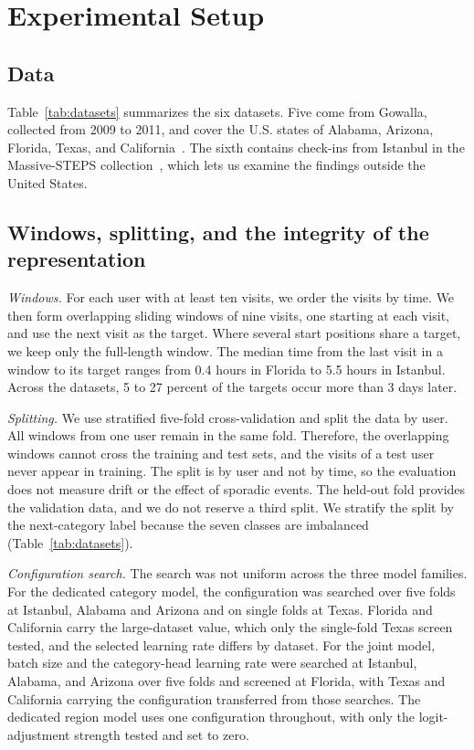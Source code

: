 \section{Experimental Setup}
\label{sec:setup}

\subsection{Data}
\label{sec:setup-data}
Table~\ref{tab:datasets} summarizes the six datasets. Five come from Gowalla, collected from 2009 to 2011, and cover the U.S. states of Alabama, Arizona, Florida, Texas, and California~\cite{cho2011gowalla}. The sixth contains check-ins from Istanbul in the Massive-STEPS collection~\cite{wongso2025massivesteps}, which lets us examine the findings outside the United States.


\subsection{Windows, splitting, and the integrity of the representation}
\label{sec:setup-windows}
\emph{Windows.} For each user with at least ten visits, we order the visits by time. We then form overlapping sliding windows of nine visits, one starting at each visit, and use the next visit as the target. Where several start positions share a target, we keep only the full-length window. The median time from the last visit in a window to its target ranges from 0.4 hours in Florida to 5.5 hours in Istanbul. Across the datasets, 5 to 27 percent of the targets occur more than 3 days later.

\emph{Splitting.} We use stratified five-fold cross-validation and split the data by user. All windows from one user remain in the same fold. Therefore, the overlapping windows cannot cross the training and test sets, and the visits of a test user never appear in training. The split is by user and not by time, so the evaluation does not measure drift or the effect of sporadic events. The held-out fold provides the validation data, and we do not reserve a third split. We stratify the split by the next-category label because the seven classes are imbalanced (Table~\ref{tab:datasets}).

\emph{Configuration search.} The search was not uniform across the three model families.
For the dedicated category model, the configuration was searched over five folds at Istanbul, Alabama and Arizona and on single folds at Texas. Florida and California carry the large-dataset value, which only the single-fold Texas screen tested, and the selected learning rate differs by dataset. For the joint model, batch size and the category-head learning rate were searched at Istanbul, Alabama, and Arizona over five folds and screened at Florida, with Texas and California carrying the configuration transferred from those searches. The dedicated region model uses one configuration throughout, with only the logit-adjustment strength tested and set to zero.

